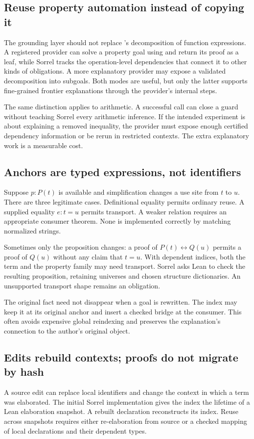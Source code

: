 \documentclass[11pt,a4paper]{article}
\newcommand{\code}[1]{\texttt{\detokenize{#1}}}
\numberwithin{equation}{section}
\theoremstyle{definition}\newtheorem{definition}[theorem]{Definition}
\theoremstyle{remark}\newtheorem{remark}[theorem]{Remark}
\begin{document}
\subsection{Reuse property automation instead of copying it}
The grounding layer should not replace \code{fun_prop}'s decomposition of
function expressions. A registered provider can solve a property goal using
\code{fun_prop} and return its proof as a leaf, while Sorrel tracks the
operation-level dependencies that connect it to other kinds of obligations.
A more explanatory provider may expose a validated decomposition into
subgoals. Both modes are useful, but only the latter supports fine-grained
frontier explanations through the provider's internal steps.

The same distinction applies to arithmetic. A successful \code{linarith}
call can close a guard without teaching Sorrel every arithmetic inference.
If the intended experiment is about explaining a removed inequality, the
provider must expose enough certified dependency information or be rerun in
restricted contexts. The extra explanatory work is a measurable cost.

\subsection{Anchors are typed expressions, not identifiers}
Suppose \(p:P(t)\) is available and simplification changes a use site from
\(t\) to \(u\). There are three legitimate cases. Definitional equality permits
ordinary reuse. A supplied equality \(e:t=u\) permits transport. A weaker
relation requires an appropriate consumer theorem. None is implemented
correctly by matching normalized strings.

Sometimes only the proposition changes: a proof of \(P(t)\leftrightarrow Q(u)\)
permits a proof of \(Q(u)\) without any claim that \(t=u\). With dependent
indices, both the term and the property family may need transport. Sorrel
asks Lean to check the resulting proposition, retaining universes and chosen
structure dictionaries. An unsupported transport shape remains an obligation.

The original fact need not disappear when a goal is rewritten. The index may
keep it at its original anchor and insert a checked bridge at the consumer.
This often avoids expensive global reindexing and preserves the explanation's
connection to the author's original object.

\subsection{Edits rebuild contexts; proofs do not migrate by hash}
A source edit can replace local identifiers and change the context in which a
term was elaborated. The initial Sorrel implementation gives the index the
lifetime of a Lean elaboration snapshot. A rebuilt declaration reconstructs
its index. Reuse across snapshots requires either re-elaboration from source
or a checked mapping of local declarations and their dependent types.
\end{document}
